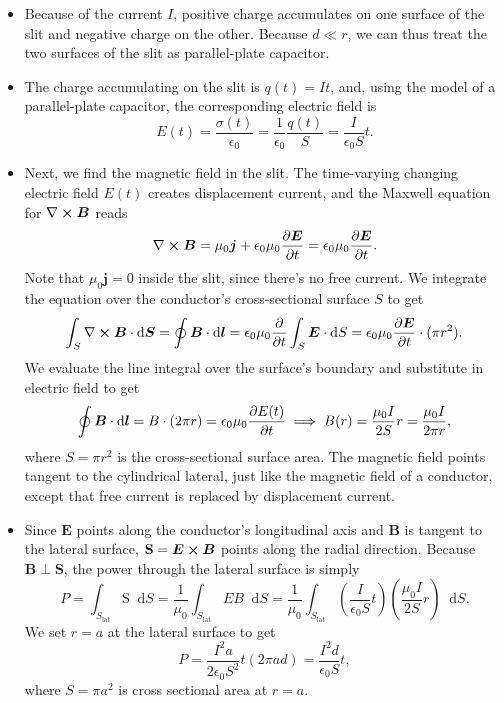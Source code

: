 \documentclass[11pt, a4paper]{article}
\newcommand{\diff}{\mathop{}\!\mathrm{d}} %
\renewcommand{\vec}[1]{\bm{#1}} %
\newcommand{\E}{\vec{E}}  %
\newcommand{\B}{\vec{B}}  %
\renewcommand{\S}{\mathbf{S}}  %
\renewcommand{\SS}{\mathrm{S}}  %
\newcommand{\ee}{\epsilon_{0}}  %
\newcommand{\mm}{\mu_{0}}  %
\newcommand{\m}{\vec{m}}  %
\renewcommand{\curl}{\nabla \cross}
\begin{document}
\begin{itemize}
	\item Because of the current $ I $, positive charge accumulates on one surface of the slit and negative charge on the other. Because $ d \ll r $, we can thus treat the two surfaces of the slit as parallel-plate capacitor. 
	
	\item The charge accumulating on the slit is $ q(t) = It $, and, using the model of a parallel-plate capacitor, the corresponding electric field is
	\begin{equation*}
		E(t) = \frac{\sigma(t)}{\ee} = \frac{1}{\ee}\frac{q(t)}{S} = \frac{I}{\ee S}t.
	\end{equation*}
	
	\item Next, we find the magnetic field in the slit. The time-varying changing electric field $ E(t) $ creates displacement current, and the Maxwell equation for $ \curl \B $ reads
	\begin{equation*}
		\curl \B  = \mm \vec{j} + \ee\mm \pdv{\E}{t} = \ee\mm \pdv{\E}{t}.
	\end{equation*}
	Note that $ \mm \vec{j} = 0 $ inside the slit, since there's no free current. We integrate the equation over the conductor's cross-sectional surface $ S $ to get
	\begin{equation*}
		\int_{S} \curl \B \cdot \diff \vec{S} = \oint \B \cdot \diff \vec{l}  = \ee \mm \pdv{t}\int_{S}\E\cdot \diff S =  \ee \mm \pdv{\E}{t} \cdot (\pi r^{2}).
	\end{equation*}
	We evaluate the line integral over the surface's boundary and substitute in electric field to get
	\begin{equation*}
        \oint \B \cdot \diff \vec{l} = B \cdot (2\pi r) = \ee \mm \pdv{E(t)}{t} \implies B(r) = \frac{\mm I}{2S} r = \frac{\mm I }{2 \pi r},
	\end{equation*}
	where $ S = \pi r^{2} $ is the cross-sectional surface area. The magnetic field points tangent to the cylindrical lateral, just like the magnetic field of a conductor, except that free current is replaced by displacement current. 
	
	
	\item Since $ \E $ points along the conductor's longitudinal axis and $ \B $ is tangent to the lateral surface, $ \S = \E \cross \B $ points along the radial direction. Because $ \B \perp \S$, the power through the lateral surface is simply
	\begin{equation*}
		P = \int_{S_{\text{lat}}} \SS \diff S = \frac{1}{\mm}\int_{S_\text{lat}} EB \diff S = \frac{1}{\mm} \int_{S_{\text{lat}}}  \left(\frac{I}{\ee S}t\right)\left(\frac{\mm I}{2S} r\right) \diff S.
	\end{equation*}
	We set $ r = a $ at the lateral surface to get
	\begin{equation*}
		P = \frac{I^{2}a}{2\ee S^{2}}t (2\pi a d) = \frac{I^{2}d}{\ee S} t,
	\end{equation*}
	where $ S = \pi a^{2} $ is cross sectional area at $ r = a $.
	

\end{itemize}
\end{document}
